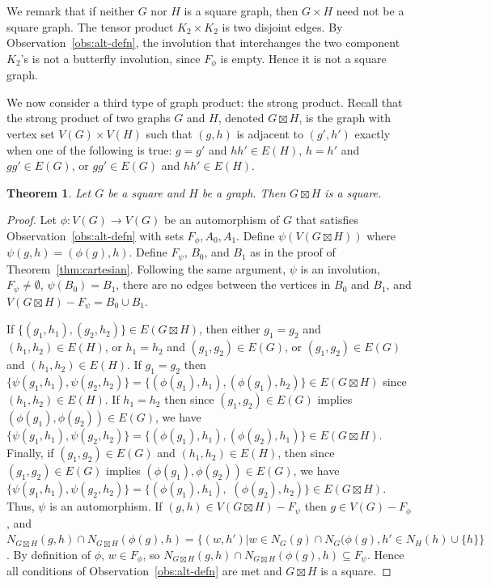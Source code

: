 \documentclass{article}
\newtheorem{theorem}{Theorem}[section]
\theoremstyle{definition}
\begin{document}
We remark that if neither $G$ nor $H$ is a square graph, then $G\times H$ need not be a square graph. The tensor product $K_2\times K_2$ is two disjoint edges. By Observation~\ref{obs:alt-defn}, the involution that interchanges the two component $K_2$'s is not a butterfly involution, since $F_{\phi}$ is empty. Hence it is not a square graph.

We now consider a third type of graph product: the strong product.
Recall that the strong product of two graphs $G$ and $H$, denoted $G \boxtimes H$, is the graph with vertex set $V(G) \times V(H)$ such that $(g,h)$ is adjacent to $(g',h')$ exactly when one of the following is true: $g=g'$ and $hh'\in E(H)$, $h=h'$ and $gg' \in E(G)$, or $gg' \in E(G)$ and $hh' \in E(H)$.

\begin{theorem} \label{thm:strong}
 Let $G$ be a square and $H$ be a graph. Then $G\boxtimes H$ is a square.    
\end{theorem}

\begin{proof}
Let $\phi:V(G)\rightarrow V(G)$ be an automorphism of $G$ that satisfies Observation~\ref{obs:alt-defn} with sets $F_{\phi}, A_0, A_1$. Define $\psi(V(G \boxtimes H))$ where $\psi(g,h) = (\phi(g), h)$. Define $F_{\psi}$,  $B_0$, and $B_1$ as in the proof of Theorem~\ref{thm:cartesian}. Following the same argument, $\psi$ is an involution, $F_{\psi} \ne \emptyset$, $\psi(B_0)=B_1$, there are no edges between the vertices in $B_0$ and $B_1$, and $V(G\boxtimes H)-F_{\psi}=B_0\cup B_1$.

If $\{(g_1,h_1), (g_2,h_2)\} \in E(G \boxtimes H)$, then either $g_1 = g_2$ and $(h_1,h_2) \in E(H)$, or $h_1 = h_2$ and $(g_1,g_2) \in E(G)$, or $(g_1,g_2) \in E(G)$ and $(h_1,h_2) \in E(H)$. If $g_1 = g_2$ then $\{\psi(g_1,h_1), \psi(g_2,h_2)\} = \{(\phi(g_1),h_1), (\phi(g_1),h_2)\} \in E(G \boxtimes H)$ since $(h_1,h_2) \in E(H)$.  If $h_1 = h_2$ then since $(g_1,g_2) \in E(G)$ implies $(\phi(g_1),\phi(g_2)) \in E(G)$, we have $\{\psi(g_1,h_1), \psi(g_2,h_2)\} = \{(\phi(g_1),h_1), (\phi(g_2),h_1)\} \in E(G \boxtimes H)$. 
Finally, if 
$(g_1,g_2) \in E(G)$ and $(h_1,h_2) \in E(H)$, then since $(g_1,g_2) \in E(G)$ implies $(\phi(g_1),\phi(g_2)) \in E(G)$, we have $\{\psi(g_1,h_1), \psi(g_2,h_2)\}=\{(\phi(g_1),h_1),$  $ (\phi(g_2),h_2)\} \in E(G \boxtimes H)$. Thus, $\psi$ is an automorphism. If $(g,h) \in V(G \boxtimes H) - F_{\psi}$ then $g \in V(G) - F_{\phi}$, and $N_{G\boxtimes H}(g,h) \cap N_{G\boxtimes H}(\phi(g),h) = \{(w,h') | w \in N_G(g) \cap N_G (\phi(g), h' \in N_H(h)\cup\{h\} \}$. By definition of $\phi$, $w \in F_{\phi}$, so  $N_{G\boxtimes H}(g,h) \cap N_{G\boxtimes H}(\phi(g),h) \subseteq F_{\psi}$. Hence all conditions of Observation~\ref{obs:alt-defn} are met and $G\boxtimes H$ is a square. 
\end{proof}
\end{document}
